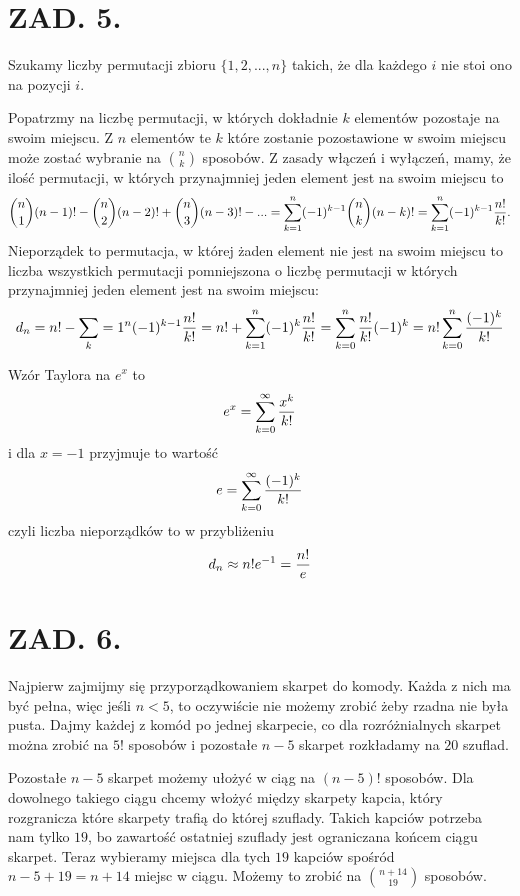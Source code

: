 \documentclass{article}[13pt]
\begin{document}
\section*{ZAD. 5.}

Szukamy liczby permutacji zbioru $\{1,2,...,n\}$ takich, że dla każdego $i$ nie stoi ono na pozycji $i$.
\medskip

Popatrzmy na liczbę permutacji, w których dokładnie $k$ elementów pozostaje na swoim miejscu. Z $n$ elementów te $k$ które zostanie pozostawione w swoim miejscu może zostać wybranie na ${n\choose k}$ sposobów. Z zasady włączeń i wyłączeń, mamy, że ilość permutacji, w których przynajmniej jeden element jest na swoim miejscu to
\begin{align*}
    {n\choose 1}(n-1)!-{n\choose 2}(n-2)!+{n\choose 3}(n-3)!-...=\sum\limits_{k=1}^n(-1)^{k-1}{n\choose k}(n-k)!=\sum\limits_{k=1}^n(-1)^{k-1}{n!\over k!}.
\end{align*}
Nieporządek to permutacja, w której żaden element nie jest na swoim miejscu to liczba wszystkich permutacji pomniejszona o liczbę permutacji w których przynajmniej jeden element jest na swoim miejscu:
\begin{align*}
    d_n=n!-\sum\limits_k=1^n(-1)^{k-1}{n!\over k!}=n!+\sum\limits_{k=1}^n(-1)^k{n!\over k!}=\sum\limits_{k=0}^n{n!\over k!}(-1)^k=n!\sum\limits_{k=0}^n{(-1)^k\over k!}
\end{align*}

Wzór Taylora na $e^x$ to
$$e^x=\sum\limits_{k=0}^\infty{x^k\over k!}$$
i dla $x=-1$ przyjmuje to wartość
$$e=\sum\limits_{k=0}^\infty{(-1)^k\over k!}$$
czyli liczba nieporządków to w przybliżeniu
$$d_n\approx n!e^{-1}={n!\over e}$$

\section*{ZAD. 6.}

Najpierw zajmijmy się przyporządkowaniem skarpet do komody. Każda z nich ma być pełna, więc jeśli $n<5$, to oczywiście nie możemy zrobić żeby rzadna nie była pusta. Dajmy każdej z komód po jednej skarpecie, co dla rozróżnialnych skarpet można zrobić na $5!$ sposobów i pozostałe $n-5$ skarpet rozkładamy na $20$ szuflad.
\medskip

Pozostałe $n-5$ skarpet możemy ułożyć w ciąg na $(n-5)!$ sposobów. Dla dowolnego takiego ciągu chcemy włożyć między skarpety kapcia, który rozgranicza które skarpety trafią do której szuflady. Takich kapciów potrzeba nam tylko $19$, bo zawartość ostatniej szuflady jest ograniczana końcem ciągu skarpet. Teraz wybieramy miejsca dla tych $19$ kapciów spośród $n-5+19=n+14$ miejsc w ciągu. Możemy to zrobić na ${n+14\choose 19}$ sposobów.
\medskip
\end{document}

